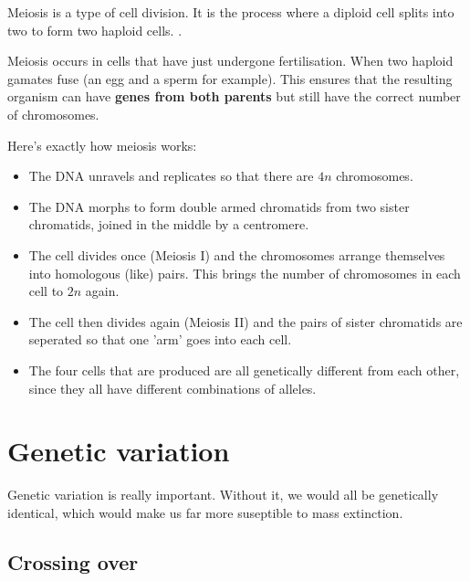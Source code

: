 \documentclass{article}
\begin{document}
Meiosis is a type of cell division. It is the process where a diploid cell
 splits into two to form two haploid cells.
.

Meiosis occurs in cells that have just undergone fertilisation. When two haploid
gamates fuse (an egg and a sperm for example). This ensures that the resulting
organism can have {\bf genes from both parents} but still have the correct
number of chromosomes.

Here's exactly how meiosis works:

\begin{itemize}

	\item The DNA unravels and replicates so that there are $4n$ chromosomes.

	\item The DNA morphs to form double armed chromatids from two sister
	chromatids, joined in the middle by a centromere.

	\item The cell divides once (Meiosis I) and the chromosomes arrange
	themselves into homologous (like) pairs. This brings the number of
	chromosomes in each cell to $2n$ again.

	\item The cell then divides again (Meiosis II) and the pairs of sister
	chromatids are seperated so that one 'arm' goes into each cell.

	\item The four cells that are produced are all genetically different from
	each other, since they all have different combinations of alleles.

\end{itemize}

\section*{Genetic variation}

Genetic variation is really important. Without it, we would all be genetically
identical, which would make us far more suseptible to mass extinction.

\subsection*{Crossing over}
\end{document}
